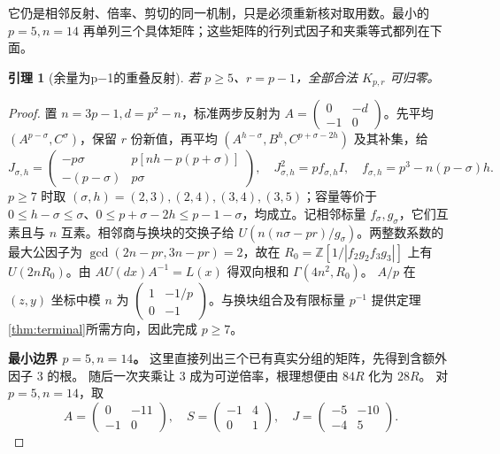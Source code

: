 \documentclass[11pt,a4paper,oneside,openany]{book}
\newcommand{\Z}{\mathbb Z}
\newtheorem{lemma}[theorem]{引理}
\theoremstyle{definition}
\numberwithin{equation}{chapter}
\begin{document}
它仍是相邻反射、倍率、剪切的同一机制，只是必须重新核对取用数。最小的 $p=5,n=14$ 再单列三个具体矩阵；这些矩阵的行列式因子和夹乘等式都列在下面。
\begin{lemma}[余量为p−1的重叠反射]\label{lem:upper-boundary}
若 $p\ge5$、$r=p-1$，全部合法 $K_{p,r}$ 可归零。
\end{lemma}
\begin{proof}
置 $n=3p-1,d=p^2-n$，标准两步反射为 $A=\left(\begin{smallmatrix}0&-d\\-1&0\end{smallmatrix}\right)$。先平均 $(A^{p-\sigma},C^\sigma)$，保留 $r$ 份新值，再平均 $(A^{h-\sigma},B^h,C^{p+\sigma-2h})$ 及其补集，给
\[
J_{\sigma,h}=\begin{pmatrix}-p\sigma&p[nh-p(p+\sigma)]\\-(p-\sigma)&p\sigma\end{pmatrix},
\quad J_{\sigma,h}^2=pf_{\sigma,h}I,\quad f_{\sigma,h}=p^3-n(p-\sigma)h.
\]
$p\ge7$ 时取 $(\sigma,h)=(2,3),(2,4),(3,4),(3,5)$；容量等价于 $0\le h-\sigma\le\sigma$、$0\le p+\sigma-2h\le p-1-\sigma$，均成立。记相邻标量 $f_\sigma,g_\sigma$，它们互素且与 $n$ 互素。相邻商与换块的交换子给 $U(n(n\sigma-pr)/g_\sigma)$。两整数系数的最大公因子为 $\gcd(2n-pr,3n-pr)=2$，故在 $R_0=\Z[1/|f_2g_2f_3g_3|]$ 上有 $U(2nR_0)$。由 $AU(dx)A^{-1}=L(x)$ 得双向根和 $\Gamma(4n^2,R_0)$。
$A/p$ 在 $(z,y)$ 坐标中模 $n$ 为 $\left(\begin{smallmatrix}1&-1/p\\0&-1\end{smallmatrix}\right)$。与换块组合及有限标量 $p^{-1}$ 提供定理\ref{thm:terminal}所需方向，因此完成 $p\ge7$。

\par\noindent\textbf{最小边界 $p=5,n=14$。}
这里直接列出三个已有真实分组的矩阵，先得到含额外因子 $3$ 的根。
随后一次夹乘让 $3$ 成为可逆倍率，根理想便由 $84R$ 化为 $28R$。
对 $p=5,n=14$，取
\[
A=\begin{pmatrix}0&-11\\-1&0\end{pmatrix},\quad
S=\begin{pmatrix}-1&4\\0&1\end{pmatrix},\quad
J=\begin{pmatrix}-5&-10\\-4&5\end{pmatrix}.
\]


\end{proof}
\end{document}
